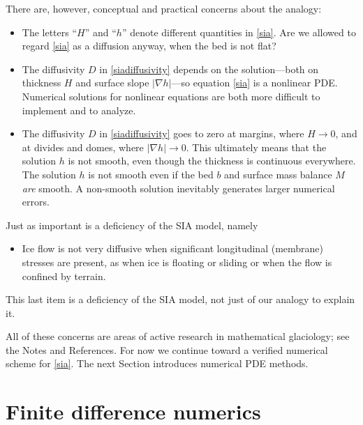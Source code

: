 \documentclass[letterpaper,final,12pt,reqno]{amsart}
\newcommand{\grad}{\nabla}
\begin{document}
There are, however, conceptual and practical concerns about the analogy:
\begin{itemize}
\item The letters ``$H$'' and ``$h$'' denote different quantities in \eqref{sia}.  Are we allowed to regard \eqref{sia} as a diffusion anyway, when the bed is not flat?
\item The diffusivity $D$ in \eqref{siadiffusivity} depends on the solution---both on thickness $H$ and surface slope $|\grad h|$---so equation \eqref{sia} is a nonlinear PDE.  Numerical solutions for nonlinear equations are both more difficult to implement and to analyze.
\item The diffusivity $D$ in \eqref{siadiffusivity} goes to zero at margins, where $H\to 0$, and at divides and domes, where $|\grad h|\to 0$.  This ultimately means that the solution $h$ is not smooth, even though the thickness is continuous everywhere.  The solution $h$ is not smooth even if the bed $b$ and surface mass balance $M$ \emph{are} smooth.  A non-smooth solution inevitably generates larger numerical errors.
\end{itemize}
Just as important is a deficiency of the SIA model, namely
\begin{itemize}
\item Ice flow is not very diffusive when significant longitudinal (membrane) stresses are present, as when ice is floating or sliding or when the flow is confined by terrain.
\end{itemize}
This last item is a deficiency of the SIA model, not just of our analogy to explain it.

All of these concerns are areas of active research in mathematical glaciology; see the Notes and References.  For now we continue toward a verified numerical scheme for \eqref{sia}.  The next Section introduces numerical PDE methods.


\section{Finite difference numerics}  \label{sec:fd}
\end{document}
